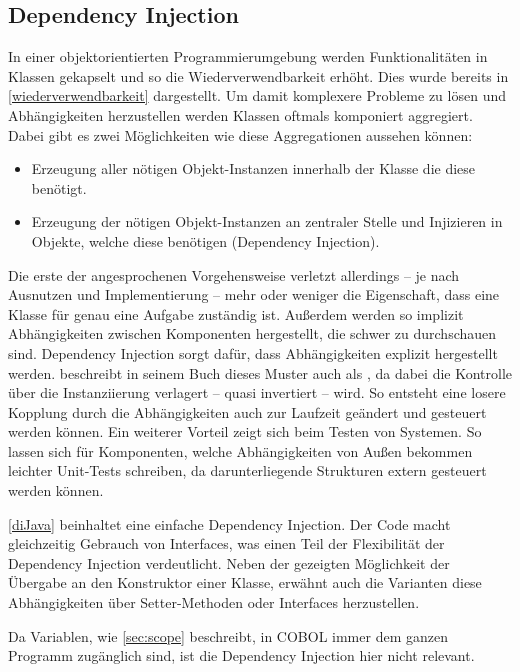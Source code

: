 \subsection{Dependency Injection}
In einer objektorientierten Programmierumgebung werden Funktionalitäten in Klassen gekapselt und so die Wiederverwendbarkeit erhöht. Dies wurde bereits in \autoref{wiederverwendbarkeit} dargestellt. Um damit komplexere Probleme zu lösen und Abhängigkeiten herzustellen werden Klassen oftmals komponiert \bzw aggregiert. Dabei gibt es zwei Möglichkeiten wie diese Aggregationen aussehen können:

\begin{itemize}
    \item Erzeugung aller nötigen Objekt-Instanzen innerhalb der Klasse die diese benötigt.
    \item Erzeugung der nötigen Objekt-Instanzen an zentraler Stelle und Injizieren in Objekte, welche diese benötigen (Dependency Injection). 
\end{itemize}

Die erste der angesprochenen Vorgehensweise verletzt allerdings -- je nach Ausnutzen und Implementierung -- mehr oder weniger die Eigenschaft, dass eine Klasse für genau eine Aufgabe zuständig ist. Außerdem werden so implizit Abhängigkeiten zwischen Komponenten hergestellt, die schwer zu durchschauen sind. Dependency Injection sorgt dafür, dass Abhängigkeiten explizit hergestellt werden. \citeauthor{martin_clean_2008} beschreibt in seinem Buch  dieses Muster auch als , da dabei die Kontrolle über die Instanziierung verlagert -- quasi invertiert -- wird. So entsteht eine losere Kopplung durch die Abhängigkeiten auch zur Laufzeit geändert und gesteuert werden können. Ein weiterer Vorteil zeigt sich beim Testen von Systemen. So lassen sich für Komponenten, welche Abhängigkeiten von Außen bekommen leichter Unit-Tests schreiben, da darunterliegende Strukturen extern gesteuert werden können.


\autoref{diJava} beinhaltet eine einfache Dependency Injection. Der Code macht gleichzeitig Gebrauch von Interfaces, was einen Teil der Flexibilität der Dependency Injection verdeutlicht. Neben der gezeigten Möglichkeit der Übergabe an den Konstruktor einer Klasse, erwähnt \citeauthor{martin_clean_2008} \cite{martin_clean_2008} auch die Varianten diese Abhängigkeiten über Setter-Methoden oder Interfaces herzustellen.

Da Variablen, wie \autoref{sec:scope} beschreibt, in COBOL immer dem ganzen Programm zugänglich sind, ist die Dependency Injection hier nicht relevant.